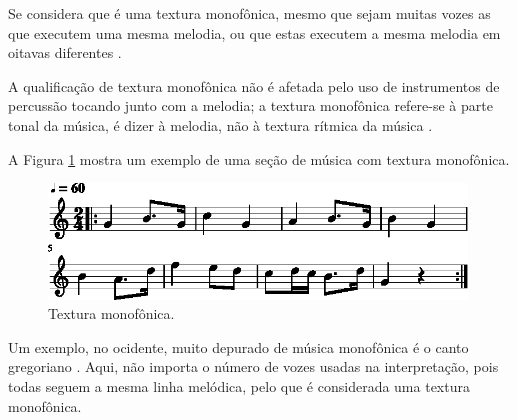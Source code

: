 Se considera que é uma textura monofônica, mesmo que sejam muitas vozes as que executem uma mesma melodia, 
ou que estas executem a mesma melodia em oitavas diferentes \cite[pp. 42]{bennett1993elementos} \cite[pp. 58]{holland2013music}.

A qualificação de textura  monofônica não é afetada pelo uso de instrumentos de percussão tocando junto com a melodia;
a textura monofônica refere-se à parte tonal da música, é dizer à melodia, 
não à textura rítmica da música \cite[pp. 58]{holland2013music}.

\begin{example}
A Figura \ref{fig:ex:monofonica} mostra um exemplo de uma seção de música com textura monofônica.
\end{example}

\begin{figure}[!h]
\centering
    \includegraphics[width=0.99\textwidth]{chapters/cap-musicalidade-percepcion/textura-monofonica-1.eps}
  \caption{Textura monofônica.}
\label{fig:ex:monofonica}
\end{figure}
 
\begin{example}
Um exemplo, no ocidente,  muito depurado de música monofônica é o canto gregoriano
\cite[pp. 77]{copland1974ouvir} \cite[pp. 29]{kerman2015listen} \cite[pp. 58]{holland2013music}. 
Aqui, não importa o número de vozes usadas na interpretação,
pois todas seguem a mesma linha melódica, pelo que é considerada uma textura monofônica.
\end{example}


